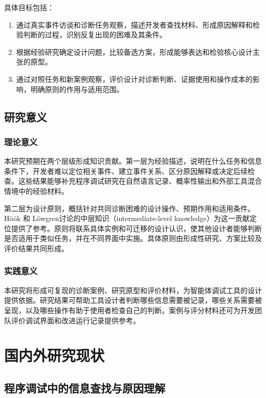 具体目标包括：

\begin{enumerate}
\item 通过真实事件访谈和诊断任务观察，描述开发者查找材料、形成原因解释和检验判断的过程，识别反复出现的困难及其条件。
\item 根据经验研究确定设计问题，比较备选方案，形成能够表达和检验核心设计主张的原型。
\item 通过对照任务和新案例观察，评价设计对诊断判断、证据使用和操作成本的影响，明确原则的作用与适用范围。
\end{enumerate}

\subsection{研究意义}

\subsubsection{理论意义}

本研究预期在两个层级形成知识贡献。第一层为经验描述，说明在什么任务和信息条件下，开发者难以定位相关事件、建立事件关系、区分原因解释或决定后续检查。这些结果能够补充程序调试研究在自然语言记录、概率性输出和外部工具混合情境中的经验材料。

第二层为设计原则，概括针对共同诊断困难的设计操作、预期作用和适用条件。Höök 和 Löwgren\cite{hook2012strong}讨论的中层知识（intermediate-level knowledge）为这一贡献定位提供了参考。原则将联系具体实例和可迁移的设计认识，使其他设计者能够判断是否适用于类似任务，并在不同界面中实施。具体原则由形成性研究、方案比较及评价结果共同形成。

\subsubsection{实践意义}

本研究将形成可复现的诊断案例、研究原型和评价材料，为智能体调试工具的设计提供依据。研究结果可帮助工具设计者判断哪些信息需要被记录，哪些关系需要被呈现，以及哪些操作有助于使用者检查自己的判断。案例与评分材料还可为开发团队评价调试界面和改进运行记录提供参考。

\section{国内外研究现状}

\subsection{程序调试中的信息查找与原因理解}

